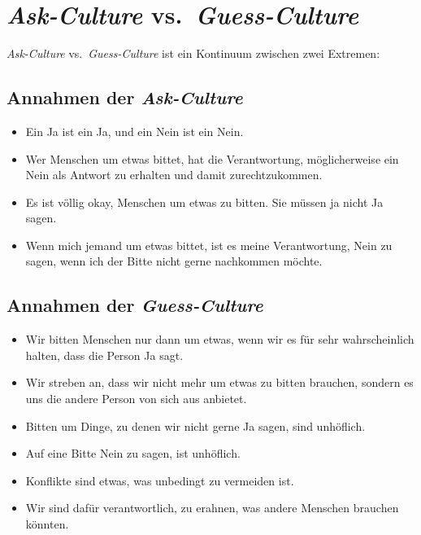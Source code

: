 \section{\emph{Ask-Culture} vs.~\emph{Guess-Culture}}
\label{ask-guess-culture}

\emph{Ask-Culture} vs.~\emph{Guess-Culture}\cite{ask-guess-culture} ist ein Kontinuum zwischen zwei Extremen:

\subsection{Annahmen der \emph{Ask-Culture}}

\begin{itemize}
    \item Ein Ja ist ein Ja, und ein Nein ist ein Nein.
    \item Wer Menschen um etwas bittet, hat die Verantwortung, möglicherweise ein Nein als Antwort zu erhalten und damit zurechtzukommen.
    \item Es ist völlig okay, Menschen um etwas zu bitten. Sie müssen ja nicht Ja sagen.
    \item Wenn mich jemand um etwas bittet, ist es meine Verantwortung, Nein zu sagen, wenn ich der Bitte nicht gerne nachkommen möchte.
\end{itemize}

\subsection{Annahmen der \emph{Guess-Culture}}

\begin{itemize}
    \item Wir bitten Menschen nur dann um etwas, wenn wir es für sehr wahrscheinlich halten, dass die Person Ja sagt.
    \item Wir streben an, dass wir nicht mehr um etwas zu bitten brauchen, sondern es uns die andere Person von sich aus anbietet.
    \item Bitten um Dinge, zu denen wir nicht gerne Ja sagen, sind unhöflich.
    \item Auf eine Bitte Nein zu sagen, ist unhöflich.
    \item Konflikte sind etwas, was unbedingt zu vermeiden ist.
    \item Wir sind dafür verantwortlich, zu erahnen, was andere Menschen brauchen könnten.
\end{itemize}

